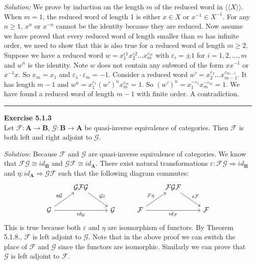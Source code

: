 \documentclass[a4paper, 12pt]{article}
\newenvironment{problem}[2][Exercise]
    { \begin{mdframed}[backgroundcolor=gray!20] \textbf{#1 #2} \\}
    {  \end{mdframed}}
\newenvironment{solution}
    {\textit{Solution:}}
    {}
\begin{document}
\begin{solution}
We prove by induction on the length \(m\) of the reduced word in \(\langle\langle X\rangle\rangle\). When \(m=1\), the reduced word of length 1 is either \(x\in X\) or \(x^{-1}\in X^{-1}\). For any 
\(n\geq 1\), \(x^n\) or \(x^{-n}\) cannot be the identity because they are reduced. Now assume we have proved that every reduced word of length smaller than \(m\) has infinite order, we need to show that this is 
also true for a reduced word of length \(m\geq 2\). Suppose we have a reduced word \(w=x_1^{\varepsilon 1}x_2^{\varepsilon 2}\ldots x_m^{\varepsilon_m}\) with \(\varepsilon_i=\pm 1\) for \(i=1,2,\ldots,m\) and \(w^n\) is the identity. Note \(w\) does not contain any 
subword of the form \(xx^{-1}\) or \(x^{-1}x\). So \(x_m=x_1\) and \(\varepsilon_1\cdot \varepsilon_m=-1\). Consider a reduced word \(w'=x_2^{\varepsilon_2}\ldots x_{m-1}^{\varepsilon_{m-1}}\). It has length \(m-1\) and 
\(w^n=x_1^{\varepsilon_1}(w')^n x_m^{\varepsilon_m}=1\). So \((w')^n=x_1^{-\varepsilon_1}x_m^{-\varepsilon_m}=1\). We have found a reduced word of length \(m-1\) with finite order. A contradiction. 
\end{solution}
\\ 
\noindent\rule{7in}{2.8pt}
\begin{problem}{5.1.3}
Let \(\mathcal{F}:\mathbf{A}\rightarrow \mathbf{B}\), \(\mathcal{G}:\mathbf{B}\rightarrow \mathbf{A}\) be quasi-inverse equivalence of categories. Then \(\mathcal{F}\) is both 
left and right adjoint to \(\mathcal{G}\).
\end{problem}
\begin{solution}
Because \(\mathcal{F}\) and \(\mathcal{G}\) are quasi-inverse equivalence of categories. We know that \(\mathcal{F}\mathcal{G}\cong id_{\mathbf{B}}\) and \(\mathcal{G}\mathcal{F}\cong id_{\mathbf{A}}\). There exist natural transformations 
\(\varepsilon:\mathcal{F}\mathcal{G}\Rightarrow id_{\mathbf{B}}\) and \(\eta:id_{\mathbf{A}}\Rightarrow \mathcal{G}\mathcal{F}\) such that the following diagram commutes:
\[\begin{tikzcd}
	& {\mathcal{G}\mathcal{F}\mathcal{G}} &&& {\mathcal{F}\mathcal{G}\mathcal{F}} \\
	{\mathcal{G}} && {\mathcal{G}} & {\mathcal{F}} && {\mathcal{F}}
	\arrow["{\mathcal{G}\varepsilon}", from=1-2, to=2-3]
	\arrow["{\varepsilon\mathcal{F}}", from=1-5, to=2-6]
	\arrow["{\eta \mathcal{G}}", from=2-1, to=1-2]
	\arrow["{id_{\mathcal{G}}}"', from=2-1, to=2-3]
	\arrow["{\mathcal{F}\eta}", from=2-4, to=1-5]
	\arrow["{id_{\mathcal{F}}}"', from=2-4, to=2-6]
\end{tikzcd}\]
This is true because both \(\varepsilon\) and \(\eta\) are isomorphism of functors. By Theorem 5.1.8., \(\mathcal{F}\) is left adjoint to \(\mathcal{G}\). Note that in the above proof we can switch the place of \(\mathcal{F}\) and \(\mathcal{G}\) since 
the functors are isomorphic. Similarly we can prove that \(\mathcal{G}\) is left adjoint to \(\mathcal{F}\).
\end{solution}
\end{document}
